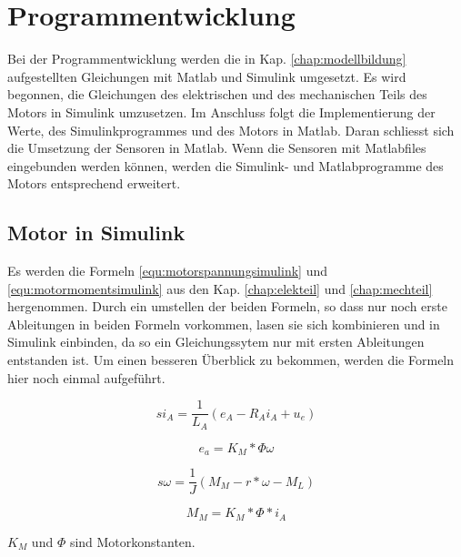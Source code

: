 \newpage




\chapter{Programmentwicklung}
\label{chap:Programmentwicklung}
Bei der Programmentwicklung werden die in Kap. \ref{chap:modellbildung} aufgestellten Gleichungen mit Matlab und Simulink umgesetzt.
Es wird begonnen, die Gleichungen des elektrischen und des mechanischen Teils des Motors in Simulink umzusetzen.
Im Anschluss folgt die Implementierung der Werte, des Simulinkprogrammes und des Motors in Matlab.
Daran schliesst sich die Umsetzung der Sensoren in Matlab.
Wenn die Sensoren mit Matlabfiles eingebunden werden können, werden die Simulink- und Matlabprogramme des Motors entsprechend erweitert.

\section{Motor in Simulink}
Es werden die Formeln \ref{equ:motorspannungsimulink} und \ref{equ:motormomentsimulink} aus den Kap. \ref{chap:elekteil} und \ref{chap:mechteil} hergenommen.
Durch ein umstellen der beiden Formeln, so dass nur noch erste Ableitungen in beiden Formeln vorkommen, lasen sie sich kombinieren und in Simulink einbinden, da so ein
Gleichungssytem nur mit ersten Ableitungen entstanden ist.
Um einen besseren Überblick zu bekommen, werden die Formeln hier noch einmal aufgeführt.
\begin{center}
\begin{equation}
\label{equ:motorspannungsimulink2}
si_A = \frac{1}{L_A} (e_A - R_Ai_A + u_e)
\end{equation}
\end{center}
\begin{center}
\begin{equation}
\label{equ:motorspannungsimulinkkonst2}
e_a = K_M * \Phi \omega
\end{equation}
\end{center}
\begin{center}
\begin{equation}
\label{equ:motormomentsimulink2}
s\omega = \frac{1}{J} (M_M - r * \omega - M_L)
\end{equation}
\end{center}
\begin{center}
\begin{equation}
\label{equ:motormomentsimulinkkonst2}
M_M = K_M * \Phi *i_A
\end{equation}
\end{center}
$K_M$ und $\Phi$ sind Motorkonstanten.

